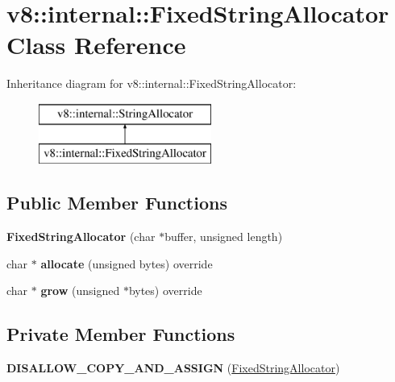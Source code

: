 \hypertarget{classv8_1_1internal_1_1_fixed_string_allocator}{}\section{v8\+:\+:internal\+:\+:Fixed\+String\+Allocator Class Reference}
\label{classv8_1_1internal_1_1_fixed_string_allocator}
Inheritance diagram for v8\+:\+:internal\+:\+:Fixed\+String\+Allocator\+:\begin{figure}[H]
\begin{center}
\leavevmode
\includegraphics[height=2.000000cm]{classv8_1_1internal_1_1_fixed_string_allocator}
\end{center}
\end{figure}
\subsection*{Public Member Functions}
\begin{DoxyCompactItemize}
\item 
{\bfseries Fixed\+String\+Allocator} (char $\ast$buffer, unsigned length)\hypertarget{classv8_1_1internal_1_1_fixed_string_allocator_a8327dc2f70cdf30c8386b460f7e2545e}{}\label{classv8_1_1internal_1_1_fixed_string_allocator_a8327dc2f70cdf30c8386b460f7e2545e}

\item 
char $\ast$ {\bfseries allocate} (unsigned bytes) override\hypertarget{classv8_1_1internal_1_1_fixed_string_allocator_a948b0119934f194ec43cb572136c83c7}{}\label{classv8_1_1internal_1_1_fixed_string_allocator_a948b0119934f194ec43cb572136c83c7}

\item 
char $\ast$ {\bfseries grow} (unsigned $\ast$bytes) override\hypertarget{classv8_1_1internal_1_1_fixed_string_allocator_ac8963e7976514b993219071c4368a430}{}\label{classv8_1_1internal_1_1_fixed_string_allocator_ac8963e7976514b993219071c4368a430}

\end{DoxyCompactItemize}
\subsection*{Private Member Functions}
\begin{DoxyCompactItemize}
\item 
{\bfseries D\+I\+S\+A\+L\+L\+O\+W\+\_\+\+C\+O\+P\+Y\+\_\+\+A\+N\+D\+\_\+\+A\+S\+S\+I\+GN} (\hyperlink{classv8_1_1internal_1_1_fixed_string_allocator}{Fixed\+String\+Allocator})\hypertarget{classv8_1_1internal_1_1_fixed_string_allocator_a2c9e9feef977052daaf36b91d10db615}{}\label{classv8_1_1internal_1_1_fixed_string_allocator_a2c9e9feef977052daaf36b91d10db615}

\end{DoxyCompactItemize}
